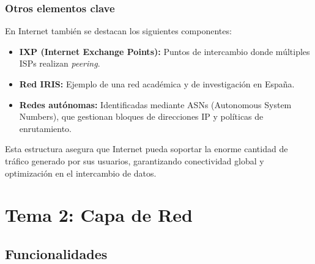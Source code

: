 \documentclass[a4paper,12pt]{article}
\begin{document}

\subsubsection{Otros elementos clave}

En Internet también se destacan los siguientes componentes:
\begin{itemize}
    \item \textbf{IXP (Internet Exchange Points):} Puntos de intercambio donde múltiples ISPs realizan \textit{peering}.
    \item \textbf{Red IRIS:} Ejemplo de una red académica y de investigación en España.
    \item \textbf{Redes autónomas:} Identificadas mediante ASNs (Autonomous System Numbers), que gestionan bloques de direcciones IP y políticas de enrutamiento.
\end{itemize}

Esta estructura asegura que Internet pueda soportar la enorme cantidad de tráfico generado por sus usuarios, garantizando conectividad global y optimización en el intercambio de datos.



\section{Tema 2: Capa de Red}

\subsection{Funcionalidades}
\end{document}
